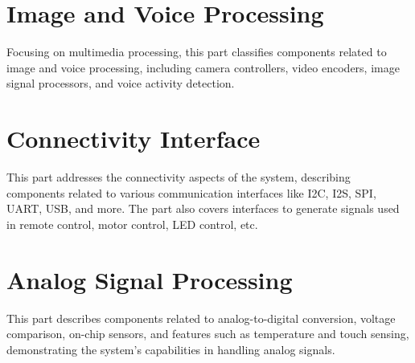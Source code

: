 \documentclass[openany, 10pt]{book}
\begin{document}
\part{Image and Voice Processing}


Focusing on multimedia processing, this part classifies components related to image and voice processing, including camera controllers, video encoders, image signal processors, and voice activity detection.


\part{Connectivity Interface}


This part addresses the connectivity aspects of the system, describing components related to various communication interfaces like I2C, I2S, SPI, UART, USB, and more. The part also covers interfaces to generate signals used in remote control, motor control, LED control, etc.



\part{Analog Signal Processing}


This part describes components related to analog-to-digital conversion, voltage comparison, on-chip sensors, and features such as temperature and touch sensing, demonstrating the system's capabilities in handling analog signals.
\end{document}
